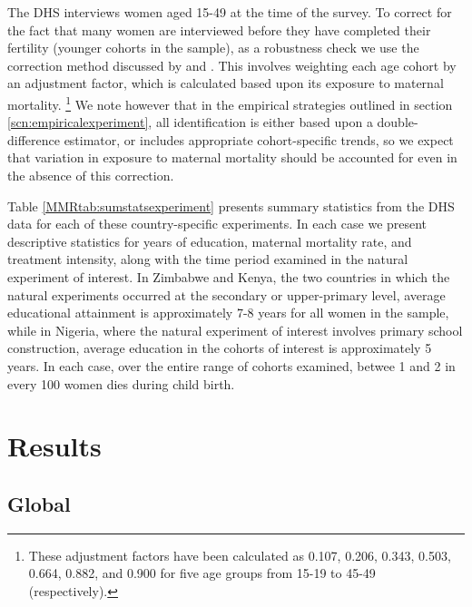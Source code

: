\documentclass{article}[12pt,subeqn]
\begin{document}
\begin{spacing}{1.4}
The DHS interviews women aged 15-49 at the time of the survey. To correct 
for the fact that many women are interviewed before they have completed their 
fertility (younger cohorts in the sample), as a robustness check we use the 
correction method discussed by \citet{RutsteinRojas2006} and 
\citet{Stantonetal1997}. This involves weighting each age cohort by an adjustment 
factor, which is calculated based upon its exposure to maternal mortality.%
\footnote{These adjustment factors have been calculated as 0.107, 0.206, 0.343, 
0.503, 0.664, 0.882, and 0.900 for five age groups from 15-19 to 45-49 
(respectively).}  We note however that in the empirical strategies outlined in 
section \ref{scn:empiricalexperiment}, all identification is either based upon a 
double-difference estimator, or includes appropriate cohort-specific trends, so 
we expect that variation in exposure to maternal mortality should be accounted for 
even in the absence of this correction.

Table \ref{MMRtab:sumstatsexperiment} presents summary statistics from the DHS 
data for each of these country-specific experiments.  In each case we present 
descriptive statistics for years of education, maternal mortality rate, and 
treatment intensity, along with the time period examined in the natural 
experiment of interest.  In Zimbabwe and Kenya, the two countries in which the 
natural experiments occurred at the secondary or upper-primary level, average 
educational attainment is approximately 7-8 years for all women in the sample, 
while in Nigeria, where the natural experiment of interest involves primary school 
construction, average education in the cohorts of interest is approximately 5 
years.  In each case, over the entire range of cohorts examined, betwee 1 and 2 
in every 100 women dies during child birth.


\section{Results}
\subsection{Global}

\end{spacing}
\end{document}
